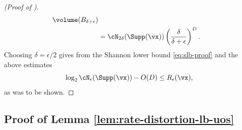 \documentclass[../../book-main.tex]{subfiles}
\begin{document}
\begin{proof}[(Proof of )]
\begin{align}
{        }
        {
            \volume(B_{\delta + \epsilon})
        }
        \\
        &=
        \cN_{2\delta}(\Supp(\vx))
        \left(
            \frac{
                \delta
            }
            {
                \delta + \epsilon
            }
        \right)^D.
    \end{align}
    Choosing $\delta = \epsilon / 2$ gives from the Shannon lower bound
    \eqref{eq:slb-proof} and the above estimates
    \begin{equation}
        \log_2 \cN_{\epsilon}(\Supp(\vx))
        - O(D)
        \leq
        R_{\epsilon}(\vx),
    \end{equation}
    as was to be shown.

\end{proof}

\subsection{Proof of Lemma
\ref{lem:rate-distortion-lb-uos}}\label{sec:app-rate-dist-deferred-proofs}
\end{document}
